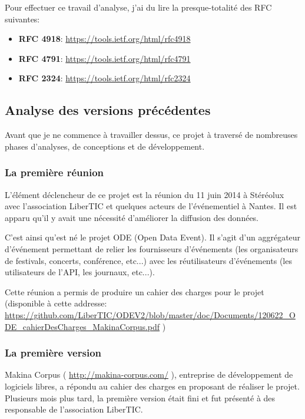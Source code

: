 Pour effectuer ce travail d'analyse, j'ai du lire la presque-totalité des RFC suivantes:
\begin{itemize}
    \item \textbf{RFC 4918}: \url{https://tools.ietf.org/html/rfc4918}
    \item \textbf{RFC 4791}: \url{https://tools.ietf.org/html/rfc4791}
    \item \textbf{RFC 2324}: \url{https://tools.ietf.org/html/rfc2324}
\end{itemize}

\subsection{Analyse des versions précédentes}

Avant que je ne commence à travailler dessus, ce projet à traversé de nombreuses phases d'analyses, de conceptions et de développement.

\subsubsection*{La première réunion}

L'élément déclencheur de ce projet est la réunion du 11 juin 2014 à Stéréolux avec l'association LiberTIC et quelques acteurs de l'événementiel à Nantes. Il est apparu qu'il y avait une nécessité d'améliorer la diffusion des données.

C'est ainsi qu'est né le projet ODE (Open Data Event). Il s'agit d'un aggrégateur d'événement permettant de relier les fournisseurs d'événements (les organisateurs de festivals, concerts, conférence, etc...) avec les réutilisateurs d'événements (les utilisateurs de l'API, les journaux, etc...).

Cette réunion a permis de produire un cahier des charges pour le projet (disponible à cette addresse: \url{https://github.com/LiberTIC/ODEV2/blob/master/doc/Documents/120622_ODE_cahierDesCharges_MakinaCorpus.pdf} )

\subsubsection*{La première version}

Makina Corpus ( \url{http://makina-corpus.com/} ), entreprise de développement de logiciels libres, a répondu au cahier des charges en proposant de réaliser le projet. Plusieurs mois plus tard, la première version était fini et fut présenté à des responsable de l'association LiberTIC.

